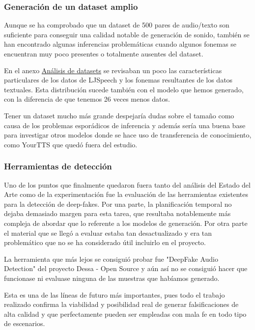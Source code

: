 \subsubsection{Generación de un dataset amplio}

Aunque se ha comprobado que un dataset de 500 pares de audio/texto son suficiente para conseguir una calidad notable de generación de sonido, también se han encontrado algunas inferencias problemáticas cuando algunos fonemas se encuentran muy poco presentes o totalmente ausentes del dataset.

En el anexo \hyperref[Análisis de datasets]{Análisis de datasets} se revisaban un poco las características particulares de los datos de LJSpeech y los fonemas resultantes de los datos textuales. Esta distribución sucede también con el modelo que hemos generado, con la diferencia de que tenemos 26 veces menos datos.

Tener un dataset mucho más grande despejaría dudas sobre el tamaño como causa de los problemas esporádicos de inferencia y además sería una buena base para investigar otros modelos donde se hace uso de transferencia de conocimiento, como YourTTS que quedó fuera del estudio.

\subsubsection{Herramientas de detección}

Uno de los puntos que finalmente quedaron fuera tanto del análisis del Estado del Arte como de la experimentación fue la evaluación de las herramientas existentes para la detección de deep-fakes. 
Por una parte, la planificación temporal no dejaba demasiado margen para esta tarea, que resultaba notablemente más compleja de abordar que lo referente a los modelos de generación. Por otra parte el material que se llegó a evaluar estaba tan desactualizado y era tan problemático que no se ha considerado útil incluirlo en el proyecto.

La herramienta que más lejos se consiguió probar fue "DeepFake Audio Detection" del proyecto 
Dessa - Open Source y aún así no se consiguió hacer que funcionase ni evaluase ninguna de las muestras que habíamos generado.

Esta es una de las líneas de futuro más importantes, pues todo el trabajo realizado confirma la viabilidad y posibilidad real de generar falsificaciones de alta calidad y que perfectamente pueden ser empleadas con mala fe en todo tipo de escenarios.

\newpage 